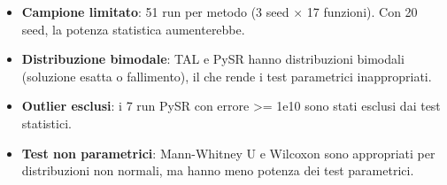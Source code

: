 \documentclass[
]{article}
\providecommand{\tightlist}{%
  \setlength{\itemsep}{0pt}\setlength{\parskip}{0pt}}
\begin{document}
\begin{itemize}
\tightlist
\item
  \textbf{Campione limitato}: 51 run per metodo (3 seed × 17 funzioni).
  Con 20 seed, la potenza statistica aumenterebbe.
\item
  \textbf{Distribuzione bimodale}: TAL e PySR hanno distribuzioni
  bimodali (soluzione esatta o fallimento), il che rende i test
  parametrici inappropriati.
\item
  \textbf{Outlier esclusi}: i 7 run PySR con errore \textgreater= 1e10
  sono stati esclusi dai test statistici.
\item
  \textbf{Test non parametrici}: Mann-Whitney U e Wilcoxon sono
  appropriati per distribuzioni non normali, ma hanno meno potenza dei
  test parametrici.
\end{itemize}
\end{document}
